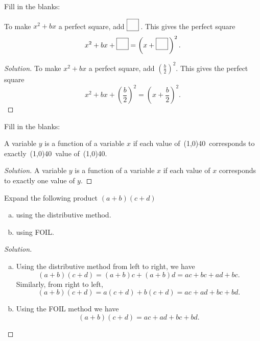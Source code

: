 \documentclass[12pt]{amsart}
\begin{document}
\begin{thm}[3 Points]\label{ex4}
  Fill in the blanks:\\
  \begin{center}
    To make $x^2 + bx$ a perfect square, add $\fbox{\raisebox{10px}{\hspace{10px}}}$\,.
    This gives the perfect square
    $$x^2 + bx + \fbox{\raisebox{10px}{\hspace{10px}}} = \left(x + \fbox{\raisebox{10px}{\hspace{10px}}}\,\right)^2.$$
  \end{center}

  \begin{proof}[Solution]
    To make $x^2 + bx$ a perfect square, add $\displaystyle{\left(\frac{b}{2}\right)^2}$.
    This gives the perfect square
    $$x^2 + bx + \left(\frac{b}{2}\right)^2 = \left(x + \frac{b}{2}\right)^2.$$
  \end{proof}
\end{thm}

\begin{thm}[3 Points]\label{ex5}
  Fill in the blanks:\\
  \begin{center}
    A variable $y$ is a function of a variable $x$ if each value of\ \line(1,0){40}\ corresponds to exactly\ \line(1,0){40}\ value of\ \line(1,0){40}.
  \end{center}

  \begin{proof}[Solution]
    A variable $y$ is a function of a variable $x$ if each value of $x$ corresponds to exactly one value of $y$.
  \end{proof}
\end{thm}

\begin{thm}[3 Points]\label{ex6}
  Expand the following product $(a + b)(c + d)$
  \begin{enumerate}[(a)]
    \item
      using the distributive method.
    \item
      using FOIL.
  \end{enumerate}

  \begin{proof}[Solution]
    \begin{enumerate}[(a)]
    \item
      Using the distributive method from left to right, we have 
      $$(a+ b)(c + d) = (a + b)c + (a + b)d = ac + bc + ad + bc.$$
      Similarly, from right to left,
      $$(a + b)(c + d) = a(c + d) + b(c + d) = ac + ad + bc + bd.$$
    \item
      Using the FOIL method we have
      $$(a + b)(c + d) = ac + ad + bc + bd.$$
    \end{enumerate}
  \end{proof}
\end{thm}
\end{document}
